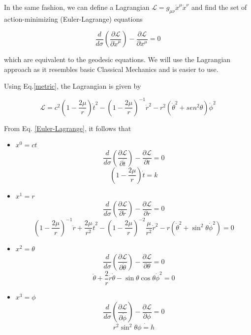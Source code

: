 \documentclass[letterpaper,11pt,onecolumn]{article}
\begin{document}
In the same fashion, we can define a Lagrangian $\mathcal{L} = g_{\mu \nu}  \dot{x}^\mu \dot{x}^\nu$ and find the set of action-minimizing (Euler-Lagrange) equations

\begin{equation}\label{Euler-Lagrange}
\frac{d}{d\sigma} \left( \frac{\partial \mathcal{L}}{\partial \dot{x}^\mu}\right) - \frac{\partial \mathcal{L}}{\partial x^\mu} = 0
\end{equation}

which are equivalent to the geodesic equations. We will use the Lagrangian approach as it resembles basic Classical Mechanics and is easier to use. 

Using Eq.\ref{metric}, the Lagrangian is given by 

\begin{equation} \label{Lagrangian}
    \mathcal{L} = c^{2}\left( 1-\frac{2\mu}{r} \right)\dot{t}^{2}-\left( 1-\frac{2\mu}{r}\right)^{-1}\dot{r}^{2}-r^{2}\left(\dot{\theta}^{2}+sen^{2}\theta\right)\dot{\phi}^{2}
\end{equation}

From Eq. \ref{Euler-Lagrange}, it follows that

\begin{itemize}
    \item $x^0 = ct$
    $$\frac{d}{d\sigma} \left( \frac{\partial \mathcal{L}}{\partial \dot{t}}\right) - \frac{\partial \mathcal{L}}{\partial t} = 0$$  $$\left( 1 - \frac{2 \mu}{r} \right) \dot{t} = k$$
    
    \item $x^1 = r$
    $$\frac{d}{d\sigma} \left( \frac{\partial \mathcal{L}}{\partial \dot{r}}\right) - \frac{\partial \mathcal{L}}{\partial r} = 0 $$
    $$\left( 1 - \frac{2 \mu}{r} \right)^{-1} \ddot{r} + \frac{2\mu}{r^2} \dot{t}^2 - \left( 1 - \frac{2 \mu}{r} \right)^{-2} \frac{\mu}{r^2} \dot{r}^2 - r \left( \dot{\theta}^2 + \sin^2 \theta \dot{\phi}^2  \right) = 0$$
    
    \item $x^2 = \theta$
    $$\frac{d}{d\sigma} \left( \frac{\partial \mathcal{L}}{\partial \dot{\theta}}\right) - \frac{\partial \mathcal{L}}{\partial \theta} = 0 $$
    $$\ddot{\theta} + \frac{2}{r} \dot{r} \dot{\theta} - \sin \theta \cos \theta \dot{\phi}^2 = 0$$
    
    \item $x^3 = \phi$
     $$ \frac{d}{d\sigma} \left( \frac{\partial \mathcal{L}}{\partial \dot{\phi}}\right) - \frac{\partial \mathcal{L}}{\partial \phi} = 0 $$
     $$r^2 \sin^2 \theta \dot{\phi = h }$$
    
\end{itemize}
\end{document}
